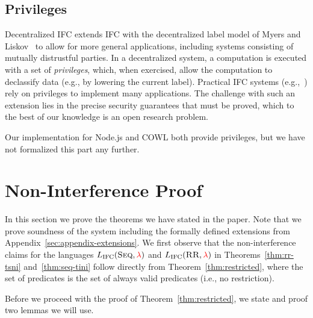 \documentclass{llncs}
\newcommand{\Red}[1]{{\color{red} #1}}
\begin{document}
\subsection{Privileges}
Decentralized IFC extends IFC with the decentralized label model of
Myers and Liskov~\cite{myers:dlm} to allow for more general
applications, including systems consisting of mutually distrustful
parties.  In a decentralized system, a computation is executed with a
set of \emph{privileges}, which, when exercised, allow the computation
to declassify data (e.g., by lowering the current label).
Practical IFC systems
(e.g.,~\cite{Zeldovich:2006, lio,
  Hritcu:2013:YIB:2497621.2498098, myers:jif}) rely on privileges to
implement many applications.
The challenge with such an extension lies in the precise
security guarantees that must be proved, which to the best of our
knowledge is an open research problem.

Our implementation for Node.js and COWL both provide privileges, but
we have not formalized this part any further.












\section{Non-Interference Proof}
\label{sec:appendix}
\label{sec:app:proof}

In this section we prove the theorems we have stated in the paper.
Note that we prove soundness of the system including the formally
defined extensions from Appendix~\ref{sec:appendix-extensions}.
We first observe that the non-interference claims for the languages
\ensuremath{L_\text{IFC}(\textsc{Seq},\Red{\lambda})} and \ensuremath{L_\text{IFC}(\textsc{RR},\Red{\lambda})}
in Theorems~\ref{thm:rr-tsni} and~\ref{thm:seq-tini} follow directly
from Theorem~\ref{thm:restricted}, where the set
of predicates is the set of always valid predicates (i.e., no restriction).

Before we proceed with the proof of Theorem~\ref{thm:restricted},
we state and proof two lemmas we will use.
\end{document}
